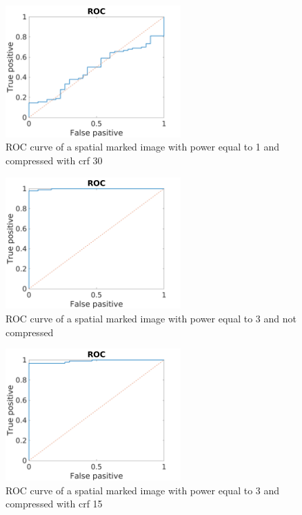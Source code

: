 \begin{figure}[h!]
\centering
\includegraphics[width=0.6\textwidth]{./img/ROC/ROC_gauss_1_30.png}
\caption{\small{ROC curve of a spatial marked image with power equal to 1 and compressed with crf 30}}
\label{fig:g1crf30}
\end{figure}
\begin{figure}[h!]
\centering
\includegraphics[width=0.6\textwidth]{./img/ROC/ROC_gauss_3_1.png}
\caption{\small{ROC curve of a spatial marked image with power equal to 3 and not compressed }}
\label{fig:g3crf1}
\end{figure}
\begin{figure}[h!]
\centering
\includegraphics[width=0.6\textwidth]{./img/ROC/ROC_gauss_3_15.png}
\caption{\small{ROC curve of a spatial marked image with power equal to 3 and compressed with crf 15 }}
\label{fig:g3crf15}
\end{figure}
